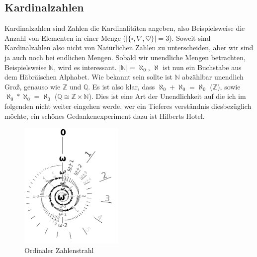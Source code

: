 \documentclass{scrartcl}
\begin{document}
\subsection{Kardinalzahlen}
Kardinalzahlen sind Zahlen die Kardinalitäten angeben, also Beispielsweise die
Anzahl von Elementen in einer Menge ($|\{\square, \nabla, \heartsuit \} | =
3$). Soweit sind Kardinalzahlen also nicht von Natürlichen Zahlen zu
unterscheiden, aber wir sind ja auch noch bei endlichen Mengen. Sobald wir
unendliche Mengen betrachten, Beispielsweise $\mathbb{N}$, wird es interessant.
$|\mathbb{N}| = \aleph_0$, $\aleph$ ist nun ein Buchstabe aus dem Häbräischen
Alphabet. Wie bekannt sein sollte ist $\mathbb{N}$ abzählbar unendlich Groß,
genauso wie $\mathbb{Z}$ und $\mathbb{Q}$. Es ist also klar, dass $\aleph_0 +
\aleph_0 = \aleph_0$ ($\mathbb{Z}$), sowie $\aleph_0 * \aleph_0 = \aleph_0$
($\mathbb{Q} \cong \mathbb{Z} \times \mathbb{N}$). Dies ist eine Art der
Unendlichkeit auf die ich im folgenden nicht weiter eingehen werde, wer ein
Tieferes verständnis diesbezüglich möchte, ein schönes Gedankenexperiment dazu
ist Hilberts Hotel.


\begin{figure}
    \centering
    \includegraphics[width=5cm]{ordinal.png}
    \caption{\label{fig:ordinal.png}Ordinaler Zahlenstrahl}
\end{figure}
\end{document}

